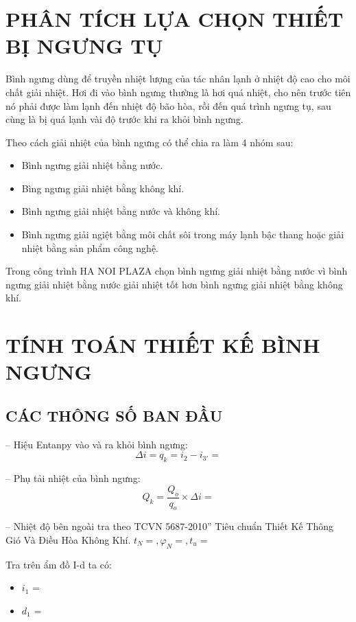 \section{PHÂN TÍCH LỰA CHỌN THIẾT BỊ NGƯNG TỤ}
Bình ngưng dùng để truyền nhiệt lượng của tác nhân lạnh ở nhiệt độ cao cho môi chất giải nhiệt. Hơi đi vào bình ngưng thường là hơi quá nhiệt, cho nên trước tiên nó phải được làm lạnh đến nhiệt độ bão hòa, rồi đến quá trình ngưng tụ, sau cùng là bị quá lạnh vài độ trước khi ra khỏi bình ngưng.

Theo cách giải nhiệt của bình ngưng có thể chia ra làm 4 nhóm sau:
\begin{itemize}
	\item Bình ngưng giải nhiệt bằng nước.
	\item Bìng ngưng giải nhiệt bằng không khí.
	\item Bình ngưng giải nhiệt bằng nước và không khí.
	\item Bình ngưng giải ngiệt bằng môi chất sôi trong máy lạnh bậc thang hoặc giải nhiệt bằng sản phẩm công nghệ.
\end{itemize}

Trong công trình HA NOI PLAZA chọn bình ngưng giải nhiệt bằng nước vì bình ngưng giải nhiệt bằng nước giải nhiệt tốt hơn bình ngưng giải nhiệt bằng không khí.
\section{TÍNH TOÁN THIẾT KẾ BÌNH NGƯNG}
\subsection{CÁC THÔNG SỐ BAN ĐẦU}
-- Hiệu Entanpy vào và ra khỏi bình ngưng:
\begin{equation*}
	\Delta i = q_{k} = i_{2} - i_{3'} = 
\end{equation*}

-- Phụ tải nhiệt của bình ngưng:
\begin{equation*}
	Q_{k} = \dfrac{Q_{o}}{q_{o}} \times \Delta i =  
\end{equation*}

-- Nhiệt độ bên ngoài tra theo TCVN 5687-2010” Tiêu chuẩn Thiết Kế Thông Gió Và Điều Hòa Không Khí.
$t_{N} = , \varphi_{N} = , t_{u} = $

Tra trên ẩm đồ I-d ta có:
\begin{itemize}
	\item $i_{1}$ =  
	\item $d_{1}$ = 
\end{itemize}

